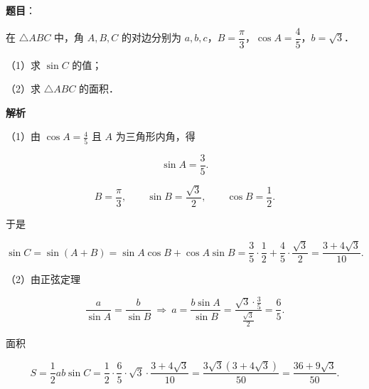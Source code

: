 \begin{answer}

\textbf{题目}：

在 $\triangle ABC$ 中，角 $A,B,C$ 的对边分别为 $a,b,c$，$B=\dfrac{\pi}{3}$，$\cos A=\dfrac45$，$b=\sqrt3$．

（1）求 $\sin C$ 的值；

（2）求 $\triangle ABC$ 的面积．

\textbf{解析}

（1）由 $\cos A=\frac45$ 且 $A$ 为三角形内角，得

\nopagebreak[4]
\[\sin A=\frac35 .\]

\nopagebreak[4]
\[B=\frac\pi3,\qquad \sin B=\frac{\sqrt3}{2},\qquad \cos B=\frac12 .\]

于是

\nopagebreak[4]
\[\sin C=\sin(A+B)=\sin A\cos B+\cos A\sin B
=\frac35\cdot\frac12+\frac45\cdot\frac{\sqrt3}{2}
=\frac{3+4\sqrt3}{10}.\]

（2）由正弦定理

\nopagebreak[4]
\[\frac{a}{\sin A}=\frac{b}{\sin B}\ \Longrightarrow\
a=\frac{b\sin A}{\sin B}=\frac{\sqrt3\cdot\frac35}{\frac{\sqrt3}{2}}=\frac65 .\]

面积

\nopagebreak[4]
\[S=\frac12ab\sin C
=\frac12\cdot\frac65\cdot\sqrt3\cdot\frac{3+4\sqrt3}{10}
=\frac{3\sqrt3(3+4\sqrt3)}{50}
=\frac{36+9\sqrt3}{50}.\]


\end{answer}
